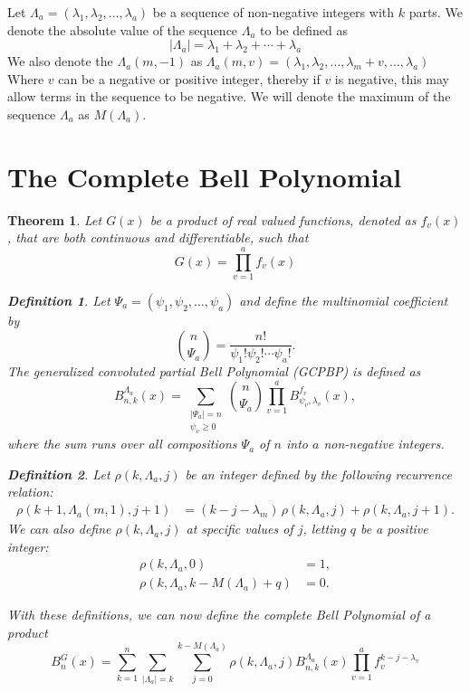 \documentclass[11pt]{article}
\theoremstyle{plain}
\newtheorem{theorem}{Theorem}[section]   %
\theoremstyle{definition}
\newtheorem{definition}{Definition}[theorem]  %
\begin{document}
Let $\Lambda_a = \left(\lambda_1,\lambda_2,\ldots,\lambda_a\right)$ be a sequence of non-negative integers with $k$ parts. We denote the absolute value of the sequence $\Lambda_a$ to be defined as
\begin{equation*}
    |\Lambda_a| = \lambda_1+\lambda_2+\cdots+\lambda_a
\end{equation*}
We also denote the $\Lambda_a(m,-1)$ as $\Lambda_a(m,v) = (\lambda_1,\lambda_2,\ldots,\lambda_m+v,\ldots,\lambda_a)$ Where
$v$ can be a negative or positive integer, thereby if $v$ is negative, this may allow terms in the sequence to be negative. We will denote the maximum of the sequence $\Lambda_a$ as $M(\Lambda_a)$.
\bigskip
\bigskip
\section{The Complete Bell Polynomial}
\begin{theorem}
Let $G(x)$ be a product of real valued functions, denoted as $f_v(x)$, that are both continuous and differentiable, such that
\begin{equation*}
    G(x) = \prod_{v=1}^{a}f_v(x)
\end{equation*}
\begin{definition}
Let $\Psi_a = (\psi_1,\psi_2,\ldots,\psi_a)$ and define the multinomial coefficient by 
\[
\binom{n}{\Psi_a} = \frac{n!}{\psi_1!\psi_2!\cdots \psi_a!}.
\] 
The generalized convoluted partial Bell Polynomial (GCPBP) is defined as
\begin{equation*}
    B_{n,k}^{\Lambda_a}(x) = \sum_{\substack{|\Psi_a|=n \\ \psi_v \ge 0}} \binom{n}{\Psi_a} \prod_{v=1}^a B_{\psi_v,\lambda_v}^{f_v}(x),
\end{equation*}
where the sum runs over all compositions $\Psi_a$ of $n$ into $a$ non-negative integers.
\end{definition}

\begin{definition}
Let $\rho(k,\Lambda_a,j)$ be an integer defined by the following recurrence relation:
\begin{align*}
    \rho(k+1,\Lambda_a(m,1),j+1) &= (k-j-\lambda_m) \, \rho(k,\Lambda_a,j) + \rho(k,\Lambda_a,j+1).
\end{align*}
We can also define $\rho(k,\Lambda_a,j)$ at specific values of $j$, letting $q$ be a positive integer:
\begin{align*}
    \rho(k,\Lambda_a,0) &= 1, \\
    \rho(k,\Lambda_a,k-M(\Lambda_a)+q) &= 0.
\end{align*}
\end{definition}
With these definitions, we can now define the complete Bell Polynomial of a product
\begin{equation*}
    B_n^G(x) = \sum_{k=1}^n \sum_{|\Lambda_a|=k} \sum_{j=0}^{k-M(\Lambda_a)}\rho(k,\Lambda_a,j) B_{n,k}^{\Lambda_a}(x) \prod_{v=1}^a f_v^{k-j-\lambda_v} \tag{T2.1}
\end{equation*}
\end{theorem}
\end{document}
